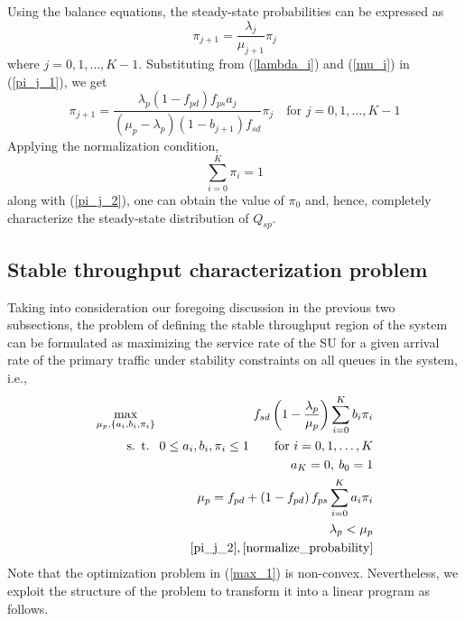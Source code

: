 \documentclass[conference]{IEEEtran}
\begin{document}
Using the balance equations, the steady-state probabilities can be expressed as
\begin{equation}\label{pi_j_1}
\displaystyle\pi_{j+1} = \frac{\lambda_j}{\mu_{j+1}}\pi_j
\end{equation}
where $j = 0,1,\ldots,K-1$. Substituting from (\ref{lambda_i}) and
(\ref{mu_i}) in (\ref{pi_j_1}), we get
\begin{equation} \label{pi_j_2}
\displaystyle\pi_{j+1}
=\frac{\lambda_p\left(1-f_{pd}\right)f_{ps}a_j}{\left(\mu_p-\lambda_p\right) \left(1-b_{j+1}\right) f_{sd}}\pi_j
\quad \text{for }j = 0,1,\ldots,K\!-\!1
\end{equation}
Applying the normalization condition,
\begin{equation}\label{normalize_probability}
    \displaystyle\sum_{i=0}^K \pi_i = 1
\end{equation}
along with (\ref{pi_j_2}), one can obtain the value of $\pi_0$ and, 
hence, completely characterize the steady-state distribution of
$Q_{sp}$.

\subsection{Stable throughput characterization problem}
Taking into consideration our foregoing discussion in the previous
two subsections, the problem of defining the stable throughput
region of the system can be formulated as maximizing the service
rate of the SU for a given arrival rate of the primary
traffic under stability constraints on all queues in the system,
i.e.,
\begin{eqnarray}
\max_{\mu_p, \{a_i, b_i, \pi_i\}} \!\!&&\!\! f_{sd} \left( 1 - \frac{\lambda_p}{\mu_p}
\right) \displaystyle\sum_{i=0}^K b_i\pi_i \nonumber \\
  \text{s. t. } \!\!&&\!\!   0 \leq a_i, b_i, \pi_i \leq 1 \qquad \text{for } i=0,1,\ldots, K  \nonumber \\
  \!\!&& \!\!  a_K=0,\: b_0=1   \nonumber\\
  \!\!&& \!\!  \mu_p = f_{pd} + \left(1-f_{pd}\right) f_{ps} \sum_{i=0}^K a_i\pi_i   \nonumber\\
  \!\!&& \!\!  \lambda_p < \mu_p \nonumber\\
  \!\!&& \!\!
   \eqref{pi_j_2},\eqref{normalize_probability}
  \label{max_1}
  \end{eqnarray}
Note that the optimization problem in (\ref{max_1}) is non-convex.
Nevertheless, we exploit the structure of the problem to transform
it into a linear program as follows.
\end{document}
